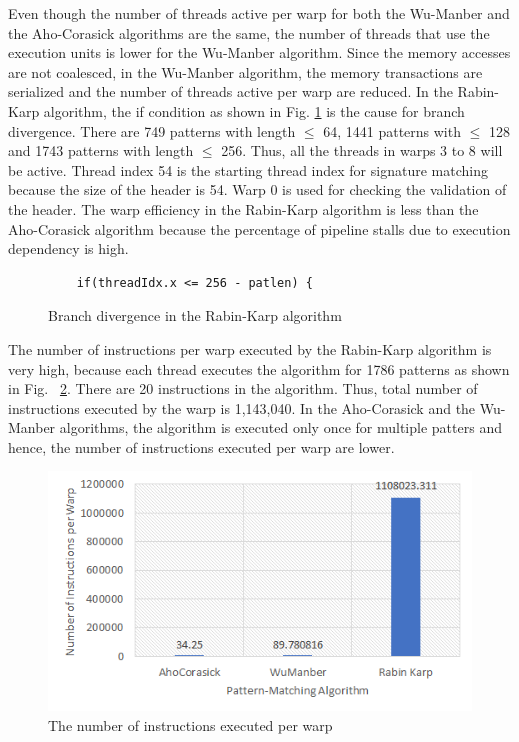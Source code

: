 Even though the number of threads active per warp for both the Wu-Manber and the Aho-Corasick algorithms are the same, the number of threads that use the execution units is lower for the Wu-Manber algorithm. Since the memory accesses are not coalesced, in the Wu-Manber algorithm, the memory transactions are serialized and the number of threads active per warp are reduced.  In the Rabin-Karp algorithm, the if condition as shown in Fig. \ref{fig:branchdivifrabinkap} is the cause for branch divergence. There are 749 patterns with length \ensuremath{\leq} 64, 1441 patterns with \ensuremath{\leq} 128 and 1743 patterns with length \ensuremath{\leq} 256. Thus, all the threads in warps 3 to 8 will be active. Thread index 54 is the starting thread index for signature matching because the size of the header is 54. Warp 0 is used for checking the validation of the header. The warp efficiency in the Rabin-Karp algorithm is less than the Aho-Corasick algorithm because the percentage of pipeline stalls due to execution dependency is high.

\begin{figure}[H]
	\centering
	\begin{lstlisting}
	if(threadIdx.x <= 256 - patlen) {
	\end{lstlisting}
	\caption{Branch divergence in the Rabin-Karp algorithm}
	\label{fig:branchdivifrabinkap}
\end{figure}
\squeezeup

The number of instructions per warp executed by the Rabin-Karp algorithm is very high, because each thread executes the algorithm for 1786 patterns as shown in Fig. ~\ref{fig:number of instructions per warp}. There are 20 instructions in the algorithm. Thus, total number of instructions executed by the warp is 1,143,040. In the Aho-Corasick and the Wu-Manber algorithms, the algorithm is executed only once for multiple patters and hence, the number of instructions executed per warp are lower.

\begin{figure}[H]
	\centering
	\includegraphics[width=12cm]{instructionsperwarp.png}
	\caption{The number of instructions executed per warp}
	\label{fig:number of instructions per warp}
\end{figure}
\squeezeup


